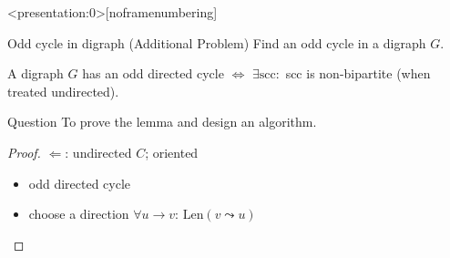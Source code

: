 \begin{frame}
  \begin{columns}
      \pause
  \end{columns}
\end{frame}

\begin{frame}<presentation:0>[noframenumbering]
  \begin{exampleblock}{Odd cycle in digraph (Additional Problem)}
    Find an odd cycle in a digraph $G$.
  \end{exampleblock}

  \pause
  \begin{lemma}
    A digraph $G$ has an odd directed cycle $\iff$ $\exists \text{scc}: $ scc is non-bipartite (when treated undirected).
  \end{lemma}

  \pause
  \begin{alertblock}{Question}
	To prove the lemma and design an algorithm.
  \end{alertblock}
  \begin{proof}
    $\Longleftarrow$: undirected $C$; oriented
      \begin{itemize}
    	\item odd directed cycle
    	\item choose a direction $\forall u \to v$: $\text{Len}(v \leadsto u)$ 
      \end{itemize}
  \end{proof}
\end{frame}
